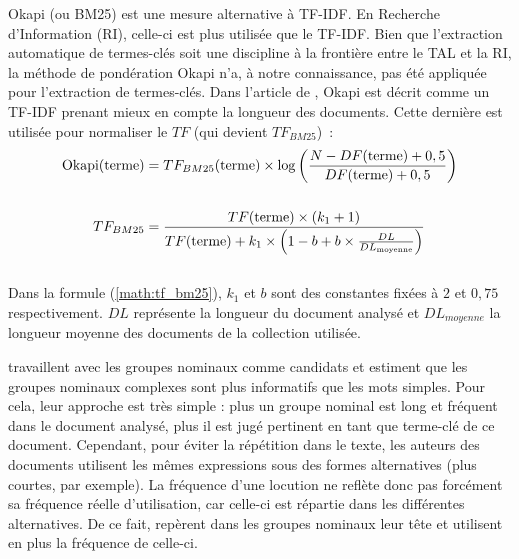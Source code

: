           Okapi (ou BM25) \cite{robertson1999okapi} est une mesure alternative
          à TF-IDF. En Recherche d'Information (RI), celle-ci est plus utilisée
          que le TF-IDF. Bien que l'extraction automatique de termes-clés soit
          une discipline à la frontière entre le TAL et la RI, la méthode de
          pondération Okapi n'a, à notre connaissance, pas été appliquée pour
          l'extraction de termes-clés. Dans l'article de
          , Okapi est décrit comme un TF-IDF
          prenant mieux en compte la longueur des documents. Cette dernière est
          utilisée pour normaliser le $TF$ (qui devient $TF_{BM25}$)~:
          \begin{align}
            \text{Okapi}(\text{terme}) &= TF_{BM25}(\text{terme}) \times \log\left(\frac{N - DF(\text{terme}) + 0,5}{DF(\text{terme}) + 0,5}\right) \label{math:okapi}\\
            \notag\\
            TF_{BM25} &= \frac{TF(\text{terme}) \times (k_1 + 1)}{TF(\text{terme}) + k_1 \times \left(1 - b + b \times \frac{DL}{DL_{\text{moyenne}}}\right)} \label{math:tf_bm25}
          \end{align}\\
          Dans la formule (\ref{math:tf_bm25}), $k_1$ et $b$ sont des constantes
          fixées à $2$ et $0,75$ respectivement. $DL$ représente la longueur du
          document analysé et $DL_{moyenne}$ la longueur moyenne des documents
          de la collection utilisée.

           travaillent avec les groupes nominaux
          comme candidats et estiment que les groupes nominaux complexes sont
          plus informatifs que les mots simples. Pour cela, leur approche est
          très simple : plus un groupe nominal est long et fréquent dans le
          document analysé, plus il est jugé pertinent en tant que terme-clé de
          ce document. Cependant, pour éviter la répétition dans le texte, les
          auteurs des documents utilisent les mêmes expressions sous des formes
          alternatives (plus courtes, par exemple). La fréquence d'une locution
          ne reflète donc pas forcément sa fréquence réelle d'utilisation, car
          celle-ci est répartie dans les différentes alternatives. De ce fait,
           repèrent dans les groupes nominaux
          leur tête et utilisent en plus la fréquence de celle-ci.

